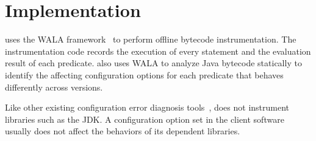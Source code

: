 \section{Implementation}
\label{sec:implementation}

\ourtool uses the WALA framework~\cite{wala} to perform offline
bytecode instrumentation. The instrumentation code
records the execution of every statement and the evaluation
result of each predicate. \ourtool also uses WALA
to analyze Java bytecode statically to
identify the affecting configuration options
for each predicate that behaves differently across versions.

Like other existing configuration error
diagnosis tools~\cite{Rabkin:2011:PPC, Zhang:2013:ADS}, \ourtool
does not instrument libraries such as the JDK.
A configuration
option set in the client software usually
does not affect the behaviors of its dependent libraries.


